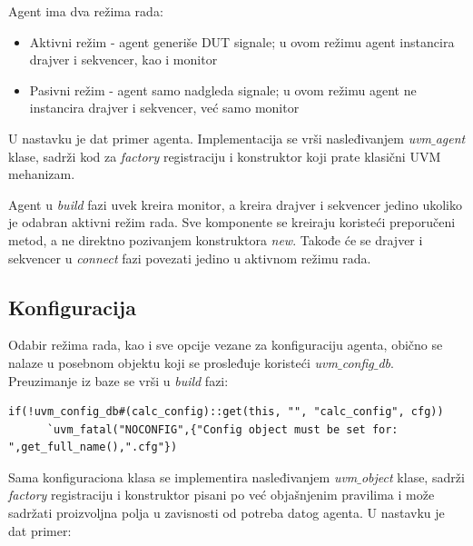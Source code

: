 Agent ima dva režima rada:

\begin{itemize}
\item Aktivni režim - agent generiše DUT signale; u ovom režimu agent instancira
  drajver i sekvencer, kao i monitor
\item Pasivni režim - agent samo nadgleda signale; u ovom režimu agent ne
  instancira drajver i sekvencer, već samo monitor
\end{itemize}

U nastavku je dat primer agenta. Implementacija se vrši nasleđivanjem
\emph{uvm\(\_\)agent} klase, sadrži kod za \emph{factory} registraciju i
konstruktor koji prate klasični UVM mehanizam.



Agent u \emph{build} fazi uvek kreira monitor, a kreira drajver i sekvencer
jedino ukoliko je odabran aktivni režim rada. Sve komponente se kreiraju
koristeći preporučeni metod, a ne direktno pozivanjem konstruktora \emph{new}.
Takođe će se drajver i sekvencer u \emph{connect} fazi povezati jedino u
aktivnom režimu rada.


\subsection{Konfiguracija}

Odabir režima rada, kao i sve opcije vezane za konfiguraciju agenta, obično se
nalaze u posebnom objektu koji se prosleđuje koristeći
\emph{uvm\(\_\)config\(\_\)db}. Preuzimanje iz baze se vrši u \emph{build} fazi:

\begin{lstlisting}
if(!uvm_config_db#(calc_config)::get(this, "", "calc_config", cfg))
      `uvm_fatal("NOCONFIG",{"Config object must be set for: ",get_full_name(),".cfg"})
\end{lstlisting}

Sama konfiguraciona klasa se implementira nasleđivanjem \emph{uvm\(\_\)object}
klase, sadrži \emph{factory} registraciju i konstruktor pisani po već
objašnjenim pravilima i može sadržati proizvoljna polja u zavisnosti od potreba
datog agenta. U nastavku je dat primer:



